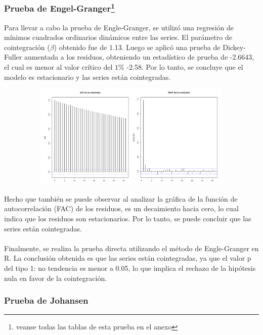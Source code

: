\documentclass[11pt]{article}
\begin{document}
\subsubsection{Prueba de Engel-Granger\footnote{veanse todas las tablas de esta prueba en el anexo}}
    \begin{flushleft}
    Para llevar a cabo la prueba de Engle-Granger, se utilizó una regresión de mínimos cuadrados ordinarios dinámicos entre las series. El parámetro de cointegración ($\beta$) obtenido fue de 1.13. Luego se aplicó una prueba de Dickey-Fuller aumentada a los residuos, obteniendo un estadístico de prueba de -2.6643, el cual es menor al valor crítico del $1\%$ -2.58. Por lo tanto, se concluye que el modelo es estacionario y las series están cointegradas.
        \begin{figure}[!ht]
          \centering
          \includegraphics[width=15cm, height=5cm]{Imagenes/ResidualesEG.png}
          \vspace{0cm}
        \end{figure}
    Hecho que también se puede observar al analizar la gráfica de la función de autocorrelación (FAC) de los residuos, es un decaimiento hacia cero, lo cual indica que los residuos son estacionarios. Por lo tanto, se puede concluir que las series están cointegradas.\\~\\
    Finalmente, se realiza la prueba directa utilizando el método de Engle-Granger en R. La conclusión obtenida es que las series están cointegradas, ya que el valor p del tipo 1: no tendencia es menor a 0.05, lo que implica el rechazo de la hipótesis nula en favor de la cointegración.
\end{flushleft}
\subsubsection{Prueba de Johansen}
\end{document}
